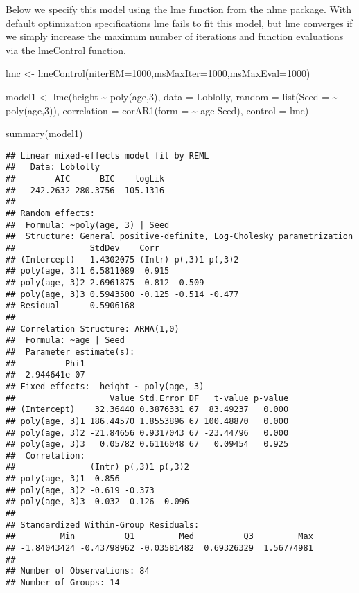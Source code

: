 \documentclass[
]{book}
\newenvironment{Shaded}{\begin{snugshade}}{\end{snugshade}}
\newcommand{\AttributeTok}[1]{\textcolor[rgb]{0.77,0.63,0.00}{#1}}
\newcommand{\DecValTok}[1]{\textcolor[rgb]{0.00,0.00,0.81}{#1}}
\newcommand{\FunctionTok}[1]{\textcolor[rgb]{0.00,0.00,0.00}{#1}}
\newcommand{\NormalTok}[1]{#1}
\newcommand{\OtherTok}[1]{\textcolor[rgb]{0.56,0.35,0.01}{#1}}
\newcommand{\SpecialCharTok}[1]{\textcolor[rgb]{0.00,0.00,0.00}{#1}}
\begin{document}
Below we specify this model using the lme function from the nlme package. With default optimization specifications lme fails to fit this model, but lme converges if we simply increase the maximum number of iterations and function evaluations via the lmeControl function.

\begin{Shaded}
\begin{Highlighting}[]
\NormalTok{lmc }\OtherTok{\textless{}{-}} \FunctionTok{lmeControl}\NormalTok{(}\AttributeTok{niterEM=}\DecValTok{1000}\NormalTok{,}\AttributeTok{msMaxIter=}\DecValTok{1000}\NormalTok{,}\AttributeTok{msMaxEval=}\DecValTok{1000}\NormalTok{)}

\NormalTok{model1 }\OtherTok{\textless{}{-}} \FunctionTok{lme}\NormalTok{(height }\SpecialCharTok{\textasciitilde{}} \FunctionTok{poly}\NormalTok{(age,}\DecValTok{3}\NormalTok{), }\AttributeTok{data =}\NormalTok{ Loblolly,}
\AttributeTok{random =} \FunctionTok{list}\NormalTok{(}\AttributeTok{Seed =} \SpecialCharTok{\textasciitilde{}} \FunctionTok{poly}\NormalTok{(age,}\DecValTok{3}\NormalTok{)),}
\AttributeTok{correlation =} \FunctionTok{corAR1}\NormalTok{(}\AttributeTok{form =} \SpecialCharTok{\textasciitilde{}}\NormalTok{ age}\SpecialCharTok{|}\NormalTok{Seed), }\AttributeTok{control =}\NormalTok{ lmc)}

\FunctionTok{summary}\NormalTok{(model1)}
\end{Highlighting}
\end{Shaded}

\begin{verbatim}
## Linear mixed-effects model fit by REML
##   Data: Loblolly 
##        AIC      BIC    logLik
##   242.2632 280.3756 -105.1316
## 
## Random effects:
##  Formula: ~poly(age, 3) | Seed
##  Structure: General positive-definite, Log-Cholesky parametrization
##               StdDev    Corr                
## (Intercept)   1.4302075 (Intr) p(,3)1 p(,3)2
## poly(age, 3)1 6.5811089  0.915              
## poly(age, 3)2 2.6961875 -0.812 -0.509       
## poly(age, 3)3 0.5943500 -0.125 -0.514 -0.477
## Residual      0.5906168                     
## 
## Correlation Structure: ARMA(1,0)
##  Formula: ~age | Seed 
##  Parameter estimate(s):
##          Phi1 
## -2.944641e-07 
## Fixed effects:  height ~ poly(age, 3) 
##                   Value Std.Error DF   t-value p-value
## (Intercept)    32.36440 0.3876331 67  83.49237   0.000
## poly(age, 3)1 186.44570 1.8553896 67 100.48870   0.000
## poly(age, 3)2 -21.84656 0.9317043 67 -23.44796   0.000
## poly(age, 3)3   0.05782 0.6116048 67   0.09454   0.925
##  Correlation: 
##               (Intr) p(,3)1 p(,3)2
## poly(age, 3)1  0.856              
## poly(age, 3)2 -0.619 -0.373       
## poly(age, 3)3 -0.032 -0.126 -0.096
## 
## Standardized Within-Group Residuals:
##         Min          Q1         Med          Q3         Max 
## -1.84043424 -0.43798962 -0.03581482  0.69326329  1.56774981 
## 
## Number of Observations: 84
## Number of Groups: 14
\end{verbatim}
\end{document}
